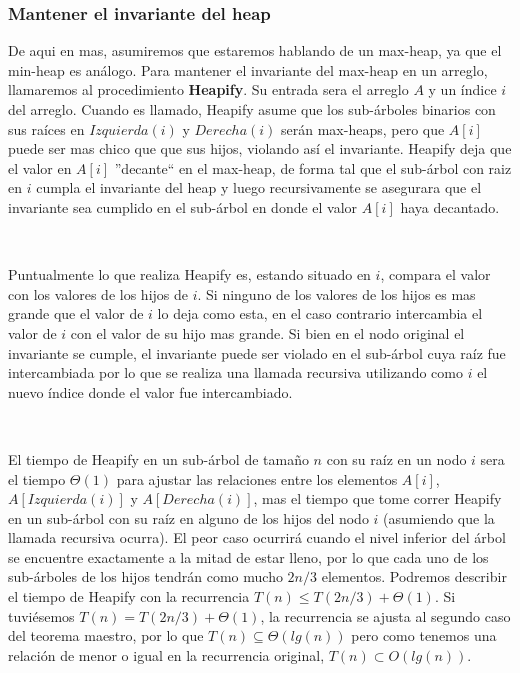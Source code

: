 \subsubsection{Mantener el invariante del heap}

De aqui en mas, asumiremos que estaremos hablando de un max-heap, ya que el min-heap es an\'alogo. Para mantener el invariante del max-heap en un arreglo, llamaremos al procedimiento \textbf{Heapify}. Su entrada sera el arreglo $A$ y un \'indice $i$ del arreglo. Cuando es llamado, Heapify asume que los sub-\'arboles binarios con sus ra\'ices en $Izquierda(i)$ y $Derecha(i)$ ser\'an max-heaps, pero que $A[i]$ puede ser mas chico que que sus hijos, violando as\'i el invariante. Heapify deja que el valor en $A[i]$ ''decante`` en el max-heap, de forma tal que el sub-\'arbol con raiz en $i$ cumpla el invariante del heap y luego recursivamente se asegurara que el invariante sea cumplido en el sub-\'arbol en donde el valor $A[i]$ haya decantado.

~

Puntualmente lo que realiza Heapify es, estando situado en $i$, compara el valor con los valores de los hijos de $i$. Si ninguno de los valores de los hijos es mas grande que el valor de $i$ lo deja como esta, en el caso contrario intercambia el valor de $i$ con el valor de su hijo mas grande. Si bien en el nodo original el invariante se cumple, el invariante puede ser violado en el sub-\'arbol cuya ra\'iz fue intercambiada por lo que se realiza una llamada recursiva utilizando como $i$ el nuevo \'indice donde el valor fue intercambiado.

~

El tiempo de Heapify en un sub-\'arbol de tama\~no $n$ con su ra\'iz en un nodo $i$ sera el tiempo $\Theta(1)$ para ajustar las relaciones entre los elementos $A[i]$, $A[Izquierda(i)]$ y $A[Derecha(i)]$, mas el tiempo que tome correr Heapify en un sub-\'arbol con su ra\'iz en alguno de los hijos del nodo $i$ (asumiendo que la llamada recursiva ocurra). El peor caso ocurrir\'a cuando el nivel inferior del \'arbol se encuentre exactamente a la mitad de estar lleno, por lo que cada uno de los sub-\'arboles de los hijos tendr\'an como mucho $2n/3$ elementos. Podremos describir el tiempo de Heapify con la recurrencia $T(n) \leq T(2n/3) + \Theta(1)$. Si tuvi\'esemos $T(n) = T(2n/3) + \Theta(1)$, la recurrencia se ajusta al segundo caso del teorema maestro, por lo que $T(n) \subseteq \Theta(lg(n))$ pero como tenemos una relaci\'on de menor o igual en la recurrencia original, $T(n) \subset O(lg(n))$.

